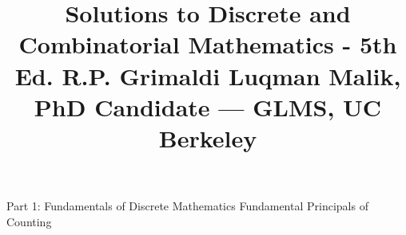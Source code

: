 \documentclass{article}
\begin{document}
\title{Solutions to Discrete and Combinatorial Mathematics - 5th Ed.
\linebreak R.P. Grimaldi
\linebreak
\linebreak
\linebreak
\Large{Luqman Malik, PhD Candidate --- GLMS, UC Berkeley} 
\linebreak 
\linebreak}
\date{}
\maketitle

\pagebreak
\begin{center}\Large{Part 1: Fundamentals of Discrete Mathematics}
\linebreak
\linebreak \large{Fundamental Principals of Counting}
\linebreak
\linebreak \end{center} 
\end{document}
